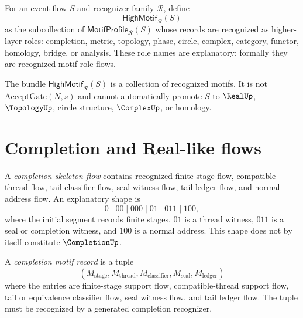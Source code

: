 \begin{definition}
\label{def:higher-case-motif-bundle}
For an event flow $S$ and recognizer family $\mathcal R$, define
$$
  \mathsf{HighMotif}_{\mathcal R}(S)
$$
as the subcollection of $\mathsf{MotifProfile}_{\mathcal R}(S)$ whose records are recognized as higher-layer roles: completion, metric, topology, phase, circle, complex, category, functor, homology, bridge, or analysis. These role names are explanatory; formally they are recognized motif role flows.
\end{definition}

\begin{remark}
\label{rem:higher-case-bundle-not-export}
The bundle $\mathsf{HighMotif}_{\mathcal R}(S)$ is a collection of recognized motifs. It is not $\mathrm{AcceptGate}(N,s)$ and cannot automatically promote $S$ to $\RealUp$, $\TopologyUp$, circle structure, $\ComplexUp$, or homology.
\end{remark}

\section{Completion and Real-like flows}
\label{sec:higher-case-completion-real}

\begin{definition}
\label{def:higher-case-completion-skeleton}
A \emph{completion skeleton flow} contains recognized finite-stage flow, compatible-thread flow, tail-classifier flow, seal witness flow, tail-ledger flow, and normal-address flow. An explanatory shape is
$$
  0\mid 00\mid 000\mid 01\mid 011\mid 100,
$$
where the initial segment records finite stages, $01$ is a thread witness, $011$ is a seal or completion witness, and $100$ is a normal address. This shape does not by itself constitute $\CompletionUp$.
\end{definition}

\begin{definition}
\label{def:higher-case-completion-record}
A \emph{completion motif record} is a tuple
$$
  (M_{\mathrm{stage}},M_{\mathrm{thread}},M_{\mathrm{classifier}},M_{\mathrm{seal}},M_{\mathrm{ledger}})
$$
where the entries are finite-stage support flow, compatible-thread support flow, tail or equivalence classifier flow, seal witness flow, and tail ledger flow. The tuple must be recognized by a generated completion recognizer.
\end{definition}

